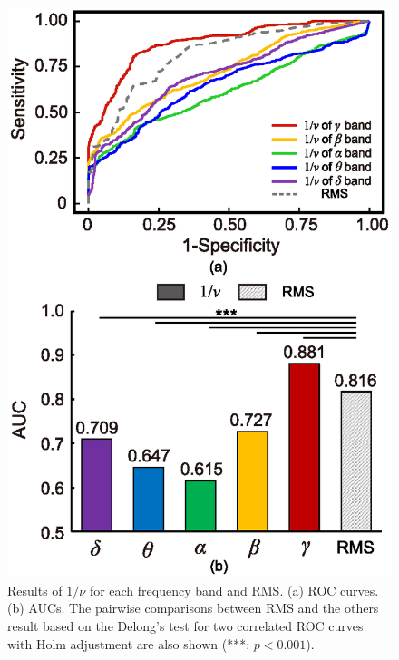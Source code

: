 \documentclass[journal]{IEEEtran}
\begin{document}
\begin{figure}[!t] %
\centering
\includegraphics[width=0.9\hsize]{figure/ROC_rms_ver5.eps}
\caption{Results of $1/\nu$ for each frequency band and RMS. (a) ROC curves. (b) AUCs. The pairwise comparisons between RMS and the others result based on the Delong's test for two correlated ROC curves with Holm adjustment are also shown (***: $p<0.001$).}
\label{fig:roc}
\end{figure}

\end{document}
